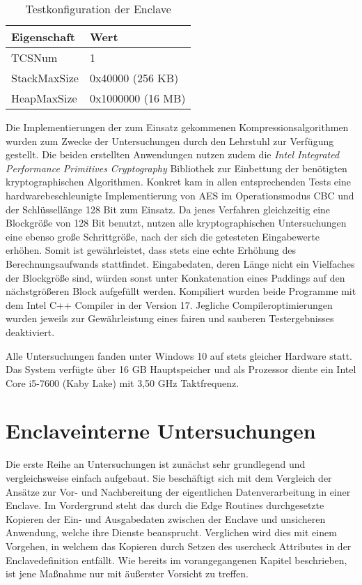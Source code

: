 \begin{table}[h]
	\centering
	\caption{Testkonfiguration der Enclave}
	\begin{tabular}{|l|l|}
		\hline
		\textbf{Eigenschaft} & \textbf{Wert} \\
		\hline
		TCSNum & 1 \\
		\hline
		StackMaxSize & 0x40000 (256 KB) \\
		\hline
		HeapMaxSize & 0x1000000 (16 MB) \\
		\hline
	\end{tabular}
	\label{tab:sgxtestconfig}
\end{table}

Die Implementierungen der zum Einsatz gekommenen Kompressionsalgorithmen wurden zum Zwecke der Untersuchungen durch den Lehrstuhl zur Verfügung gestellt. Die beiden erstellten Anwendungen nutzen zudem die \textit{Intel Integrated Performance Primitives Cryptography} Bibliothek zur Einbettung der benötigten kryptographischen Algorithmen. Konkret kam in allen entsprechenden Tests eine hardwarebeschleunigte Implementierung von \ac{AES} im Operationsmodus \ac{CBC} und der Schlüssellänge 128 Bit zum Einsatz. Da jenes Verfahren gleichzeitig eine Blockgröße von 128 Bit benutzt, nutzen alle kryptographischen Untersuchungen eine ebenso große Schrittgröße, nach der sich die getesteten Eingabewerte erhöhen. Somit ist gewährleistet, dass stets eine echte Erhöhung des Berechnungsaufwands stattfindet. Eingabedaten, deren Länge nicht ein Vielfaches der Blockgröße sind, würden sonst unter Konkatenation eines Paddings auf den nächstgrößeren Block aufgefüllt werden. Kompiliert wurden beide Programme mit dem Intel C++ Compiler in der Version 17. Jegliche Compileroptimierungen wurden jeweils zur Gewährleistung eines fairen und sauberen Testergebnisses deaktiviert.

Alle Untersuchungen fanden unter Windows 10 auf stets gleicher Hardware statt. Das System verfügte über 16 GB Hauptspeicher und als Prozessor diente ein Intel Core i5-7600 (Kaby Lake) mit 3,50 GHz Taktfrequenz.

\section{Enclaveinterne Untersuchungen}

Die erste Reihe an Untersuchungen ist zunächst sehr grundlegend und vergleichsweise einfach aufgebaut. Sie beschäftigt sich mit dem Vergleich der Ansätze zur Vor- und Nachbereitung der eigentlichen Datenverarbeitung in einer Enclave. Im Vordergrund steht das durch die Edge Routines durchgesetzte Kopieren der Ein- und Ausgabedaten zwischen der Enclave und unsicheren Anwendung, welche ihre Dienste beansprucht. Verglichen wird dies mit einem Vorgehen, in welchem das Kopieren durch Setzen des user\textunderscore check Attributes in der Enclavedefinition entfällt. Wie bereits im vorangegangenen Kapitel beschrieben, ist jene Maßnahme nur mit äußerster Vorsicht zu treffen.

